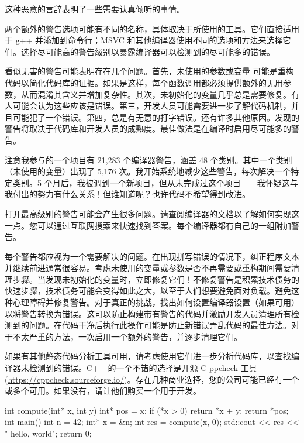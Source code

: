 这种恶意的言辞表明了一些需要认真倾听的事情。

两个额外的警告选项可能有不同的名称，具体取决于所使用的工具。它们直接适用于 g++ 并添加到命令行；MSVC 和其他编译器使用不同的选项和方法来选择它们。选择尽可能高的警告级别以暴露编译器可以检测到的尽可能多的错误。


看似无害的警告可能表明存在几个问题。首先，未使用的参数或变量 可能是重构代码以简化代码库的证据。如果是这样，每个函数调用都必须提供额外的无用参数，从而混淆其含义并增加复杂性。其次，未初始化的变量几乎总是需要修复。有人可能会认为这些应该是错误。第三，开发人员可能需要进一步了解代码机制，并且可能犯了一个错误。第四，总是有无意的打字错误。还有许多其他原因。发现的警告将取决于代码库和开发人员的成熟度。最佳做法是在编译时启用尽可能多的警告。

注意我参与的一个项目有 21,283 个编译器警告，涵盖 48 个类别。其中一个类别（未使用的变量）出现了 5,176 次。我开始系统地减少这些警告，每次解决一个特定类别。5 个月后，我被调到一个新项目，但从未完成过这个项目——我怀疑这与我付出的努力有什么关系！但谁知道呢？也许代码不希望得到改进。


打开最高级别的警告可能会产生很多问题。请查阅编译器的文档以了解如何实现这一点。您可以通过互联网搜索来快速找到答案。每个编译器都有自己的一组附加警告。

每个警告都应视为一个需要解决的问题。在出现拼写错误的情况下，纠正程序文本并继续前进通常很容易。考虑未使用的变量或参数是否不再需要或重构期间需要清理步骤。当发现未初始化的变量时，立即修复它们！不修复警告是积累技术债务的快速步骤，技术债务可能会变得如此之大，以至于人们想要避免面对负载。避免这种心理障碍并修复警告。对于真正的挑战，找出如何设置编译器设置（如果可用） 以将警告转换为错误。这可以防止构建带有警告的代码并激励开发人员清理所有检测到的问题。在代码干净后执行此操作可能是防止新错误弄乱代码的最佳方法。对于不太严重的方法，一次启用一个额外的警告，并逐步清理它们。

如果有其他静态代码分析工具可用，请考虑使用它们进一步分析代码库，以查找编译器未检测到的错误。C++ 的一个不错的选择是开源 C ppcheck 工具 (\url{https://cppcheck.sourceforge.io/})。存在几种商业选择，您的公司可能已经有一个或多个可用。如果没有，请让他们购买一个用于开发。


\begin{cpp}
int compute(int* x, int y) {
  int* pos = x;
  if (*x > 0)
    return *x + y;
  return *pos;
}
int main() {
  int n = 42;
  int* x = &n;
  int res = compute(x, 0);
  std::cout << res << " hello, world\n";
  return 0;
}
\end{cpp}

